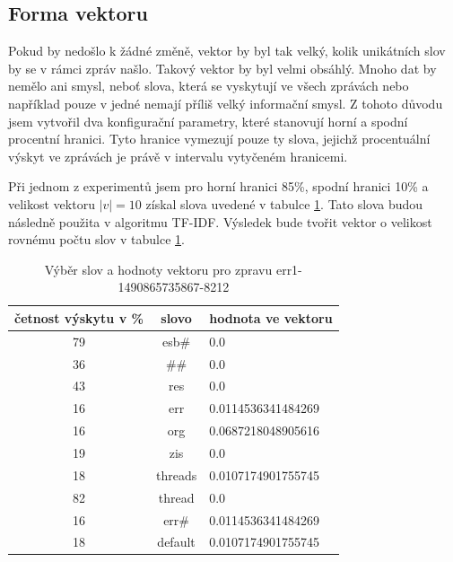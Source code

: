 \documentclass[thesis=M,czech]{FITthesis}[2012/10/20]
\begin{document}
		\subsection{Forma vektoru}
		Pokud by nedošlo k žádné změně, vektor by byl tak velký, kolik unikátních slov by se v rámci zpráv našlo. Takový vektor by byl velmi obsáhlý. Mnoho dat by nemělo ani smysl, neboť slova, která se vyskytují ve všech zprávách nebo například pouze v jedné nemají příliš velký informační smysl. Z tohoto důvodu jsem vytvořil dva konfigurační parametry, které stanovují horní a spodní procentní hranici. Tyto hranice vymezují pouze ty slova, jejichž procentuální výskyt ve zprávách je právě v intervalu vytyčeném hranicemi.  
		
		Při jednom z experimentů jsem pro horní hranici 85\%, spodní hranici 10\%  a velikost vektoru $|v| = 10$ získal slova uvedené v tabulce \ref{tab:vector-err}. Tato slova budou následně použita v algoritmu TF-IDF. Výsledek bude tvořit vektor o velikost rovnému počtu slov v tabulce \ref{tab:vector-err}.
		
		\begin{table}[htb]\centering
			\centering
			\caption{Výběr slov a hodnoty vektoru pro zpravu err1-1490865735867-8212}
			\label{tab:vector-err}
			\begin{tabular}{|c|c|l|}
				\hline
				\textbf{četnost výskytu v \%} & \textbf{slovo} & \multicolumn{1}{c|}{\textbf{hodnota ve vektoru}} \\ \hline
				79                            & esb\#          & 0.0                                                               \\ \hline
				36                            & \#\#           & 0.0                                                               \\ \hline
				43                            & res            & 0.0                                                               \\ \hline
				16                            & err            & 0.0114536341484269                                                \\ \hline
				16                            & org            & 0.0687218048905616                                                \\ \hline
				19                            & zis            & 0.0                                                               \\ \hline
				18                            & threads        & 0.0107174901755745                                                \\ \hline
				82                            & thread         & 0.0                                                               \\ \hline
				16                            & err\#          & 0.0114536341484269                                                \\ \hline
				18                            & default        & 0.0107174901755745                                                \\ \hline
			\end{tabular}
		\end{table}
		
\end{document}
